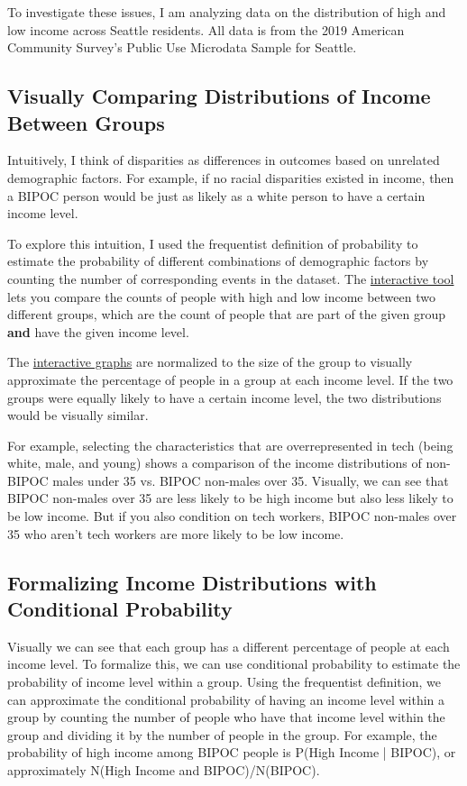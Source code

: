 \documentclass[11pt]{article}
\begin{document}
To investigate these issues, I am analyzing data on the distribution of high and low income across Seattle residents. All data is from the 2019 American Community Survey's Public Use Microdata Sample for Seattle.\cite{acs}\cite{pums} 

\subsection*{Visually Comparing Distributions of Income Between Groups}

Intuitively, I think of disparities as differences in outcomes based on unrelated demographic factors. For example, if no racial disparities existed in income, then a BIPOC person would be just as likely as a white person to have a certain income level.

To explore this intuition, I used the frequentist definition of probability\cite{piech:prob} to estimate the probability of different combinations of demographic factors by counting the number of corresponding events in the dataset. The \href{https://observablehq.com/@chaya/check-for-your-privilege}{interactive tool} lets you compare the counts of people with high and low income between two different groups, which are the count of people that are part of the given group \textbf{and} have the given income level.\cite{piech:and}

The \href{https://observablehq.com/@chaya/check-for-your-privilege}{interactive graphs} are normalized to the size of the group to visually approximate the percentage of people in a group at each income level. If the two groups were equally likely to have a certain income level, the two distributions would be visually similar.

For example, selecting the characteristics that are overrepresented in tech (being white, male, and young) shows a comparison of the income distributions of non-BIPOC males under 35 vs. BIPOC non-males over 35.  Visually, we can see that BIPOC non-males over 35 are less likely to be high income but also less likely to be low income. But if you also condition on tech workers, BIPOC non-males over 35 who aren't tech workers are more likely to be low income.

\subsection*{Formalizing Income Distributions with Conditional Probability}

Visually we can see that each group has a different percentage of people at each income level. To formalize this, we can use conditional probability\cite{piech:cond} to estimate the probability of income level within a group. Using the frequentist definition, we can approximate the conditional probability of having an income level within a group by counting the number of people who have that income level within the group and dividing it by the number of people in the group. For example, the probability of high income among BIPOC people is P(High Income | BIPOC), or approximately N(High Income and BIPOC)/N(BIPOC).
\end{document}
